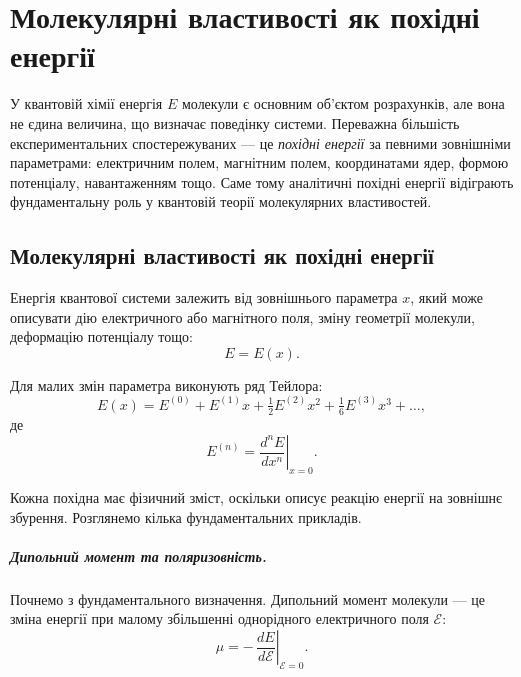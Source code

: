 
\chapter{Молекулярні властивості як похідні енергії}

У квантовій хімії енергія $E$ молекули є основним об'єктом розрахунків, але
вона не єдина величина, що визначає поведінку системи.
Переважна більшість експериментальних спостережуваних --- це \emph{похідні
	енергії} за певними зовнішніми параметрами:
електричним полем, магнітним полем, координатами ядер, формою потенціалу,
навантаженням тощо.
Саме тому аналітичні похідні енергії відіграють фундаментальну роль
у квантовій теорії молекулярних властивостей.

\section{Молекулярні властивості як похідні енергії}

Енергія квантової системи залежить від зовнішнього параметра $x$,
який може описувати дію електричного або магнітного поля,
зміну геометрії молекули, деформацію потенціалу тощо:
\begin{equation}
	E = E(x).
	\label{eq:E_x_def}
\end{equation}

Для малих змін параметра виконують ряд Тейлора:
\begin{equation}
	E(x)=
	E^{(0)} + E^{(1)}x + \tfrac12 E^{(2)}x^2 + \tfrac16 E^{(3)}x^3 + \dots,
	\label{eq:E_Taylor}
\end{equation}
де
\begin{equation}
	E^{(n)} =
	\left.\frac{d^n E}{dx^n}\right|_{x=0}.
	\label{eq:E_n_def}
\end{equation}

Кожна похідна має фізичний зміст, оскільки описує реакцію енергії на зовнішнє збурення. Розглянемо кілька фундаментальних прикладів.

\paragraph{Дипольний момент та поляризовність.}

Почнемо з фундаментального визначення.
Дипольний момент молекули --- це зміна енергії при малому збільшенні
однорідного електричного поля $\mathcal{E}$:
\begin{equation}
	\mu = -\,\left.\frac{dE}{d\mathcal{E}}\right|_{\mathcal{E}=0}.
	\label{eq:dipole_def}
\end{equation}

